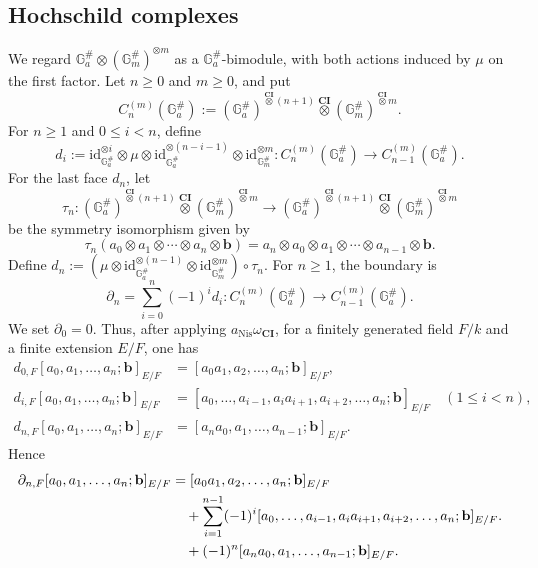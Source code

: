 \documentclass[a4paper,12pt,reqno]{amsart}
\numberwithin{equation}{section}
\theoremstyle{definition}
\newcommand{\Id}{\mathrm{id}}
\newcommand{\blue}{\color{blue}}
\newcommand{\black}{\color{black}}
\newcommand{\CI}{\operatorname{\mathbf{CI}}}
\newcommand{\GaSharp}{\mathbb{G}_{a}^{\#}}
\newcommand{\GmSharp}{\mathbb G_m^{\#}}
\newcommand{\Nis}{\mathrm{Nis}}
\newcommand{\vb}{\mathbf{b}}
\begin{document}
\subsection{Hochschild complexes}
We regard
$\GaSharp\otimes(\GmSharp)^{\otimes m}$
as a $\GaSharp$-bimodule, with both actions induced
by $\mu$ on the first factor.
Let $n\geq0$ and $m\geq0$, and put
\begin{equation}\label{eq:HH-chain}
 C_n^{(m)}(\GaSharp) :=
 (\GaSharp)^{\overset{\CI}{\otimes} (n+1)}\overset{\CI}{\otimes}(\GmSharp)^{\overset{\CI}{\otimes} m}.
\end{equation}
For $n\geq1$ and $0\leq i<n$, define
\begin{equation}\label{eq:HH-face}
 d_i
 :=
 \Id_{\GaSharp}^{\otimes i}
 \otimes\mu
 \otimes
 \Id_{\GaSharp}^{\otimes(n-i-1)}
 \otimes
 \Id_{\GmSharp}^{\otimes m}:
 C_n^{(m)}(\GaSharp)
 \to
 C_{n-1}^{(m)}(\GaSharp).
\end{equation}
For the last face $d_n$,
let
\[
 \tau_n:
 (\GaSharp)^{\overset{\CI}{\otimes}(n+1)}
 \overset{\CI}{\otimes}(\GmSharp)^{\overset{\CI}{\otimes} m}
 \to
 (\GaSharp)^{\overset{\CI}{\otimes}(n+1)}
 \overset{\CI}{\otimes}(\GmSharp)^{\overset{\CI}{\otimes} m}
\]
be the symmetry isomorphism given by
\begin{equation}\label{eq:HH-cyclic}
 \tau_n
 (a_0\otimes a_1\otimes\cdots\otimes a_n\otimes\vb)
 =
 a_n\otimes a_0\otimes a_1\otimes\cdots\otimes a_{n-1}\otimes\vb.
\end{equation}
Define
$d_n
 :=
 \left(
 \mu\otimes
 \Id_{\GaSharp}^{\otimes(n-1)}
 \otimes
 \Id_{\GmSharp}^{\otimes m}
 \right)
 \circ\tau_n$.
For $n\geq1$, the boundary is 
\begin{equation}\label{eq:HH-boundary}
 \partial_n=\sum_{i=0}^{n}(-1)^i d_i:
 C_n^{(m)}(\GaSharp)\to C_{n-1}^{(m)}(\GaSharp).
\end{equation}
We set $\partial_0 = 0$.
Thus, after applying
$a_{\Nis}\omega_{\CI}$, 
for a finitely
generated field $F/k$ and a finite extension $E/F$, one has
\begin{align}
 d_{0,F}
 [a_0,a_1,\ldots,a_n;\vb]_{E/F}
 &=
 [a_0a_1,a_2,\ldots,a_n;\vb]_{E/F},
 \label{eq:face-zero}\\
 d_{i,F}
 [a_0,a_1,\ldots,a_n;\vb]_{E/F}
 &=
 [a_0,\ldots,a_{i-1},a_ia_{i+1},
 a_{i+2},\ldots,a_n;\vb]_{E/F}
 \quad (1\leq i<n),
 \label{eq:face-middle}\\
 d_{n,F}
 [a_0,a_1,\ldots,a_n;\vb]_{E/F}
 &=
 [a_na_0,a_1,\ldots,a_{n-1};\vb]_{E/F}.
 \label{eq:face-last}
\end{align}
Hence
\begin{align}
 \partial_{n,F}
 [a_0,a_1,\ldots,a_n;\vb]_{E/F}
 \notag
 &=
 [a_0a_1,a_2,\ldots,a_n;\vb]_{E/F}
 \notag\\
 &\quad+
 \sum_{i=1}^{n-1}(-1)^i
 [a_0,\ldots,a_{i-1},a_ia_{i+1},
 a_{i+2},\ldots,a_n;\vb]_{E/F}.
  \notag\\
  &\quad+
  (-1)^n
  [a_na_0,a_1,\ldots,a_{n-1};\vb]_{E/F}. \label{eq:HH-boundary-field}
\end{align}
\end{document}
